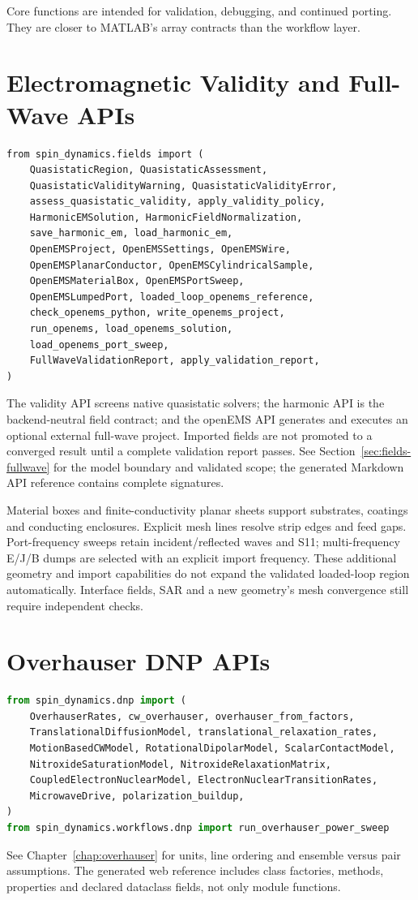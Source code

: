 \documentclass[11pt,oneside]{report}
\begin{document}
Core functions are intended for validation, debugging, and continued porting.
They are closer to MATLAB's array contracts than the workflow layer.

\section{Electromagnetic Validity and Full-Wave APIs}

\begin{lstlisting}
from spin_dynamics.fields import (
    QuasistaticRegion, QuasistaticAssessment,
    QuasistaticValidityWarning, QuasistaticValidityError,
    assess_quasistatic_validity, apply_validity_policy,
    HarmonicEMSolution, HarmonicFieldNormalization,
    save_harmonic_em, load_harmonic_em,
    OpenEMSProject, OpenEMSSettings, OpenEMSWire,
    OpenEMSPlanarConductor, OpenEMSCylindricalSample,
    OpenEMSMaterialBox, OpenEMSPortSweep,
    OpenEMSLumpedPort, loaded_loop_openems_reference,
    check_openems_python, write_openems_project,
    run_openems, load_openems_solution,
    load_openems_port_sweep,
    FullWaveValidationReport, apply_validation_report,
)
\end{lstlisting}

The validity API screens native quasistatic solvers; the harmonic API is the
backend-neutral field contract; and the openEMS API generates and executes an
optional external full-wave project. Imported fields are not promoted to a
converged result until a complete validation report passes. See
Section~\ref{sec:fields-fullwave} for the model boundary and validated scope;
the generated Markdown API reference contains complete signatures.

Material boxes and finite-conductivity planar sheets support substrates,
coatings and conducting enclosures. Explicit mesh lines resolve strip edges
and feed gaps. Port-frequency sweeps retain incident/reflected waves and S11;
multi-frequency E/J/B dumps are selected with an explicit import frequency.
These additional geometry and import capabilities do not expand the validated
loaded-loop region automatically. Interface fields, SAR and a new geometry's
mesh convergence still require independent checks.

\section{Overhauser DNP APIs}
\begin{lstlisting}[language=Python]
from spin_dynamics.dnp import (
    OverhauserRates, cw_overhauser, overhauser_from_factors,
    TranslationalDiffusionModel, translational_relaxation_rates,
    MotionBasedCWModel, RotationalDipolarModel, ScalarContactModel,
    NitroxideSaturationModel, NitroxideRelaxationMatrix,
    CoupledElectronNuclearModel, ElectronNuclearTransitionRates,
    MicrowaveDrive, polarization_buildup,
)
from spin_dynamics.workflows.dnp import run_overhauser_power_sweep
\end{lstlisting}
See Chapter~\ref{chap:overhauser} for units, line ordering and ensemble versus
pair assumptions. The generated web reference includes class factories,
methods, properties and declared dataclass fields, not only module functions.
\end{document}
